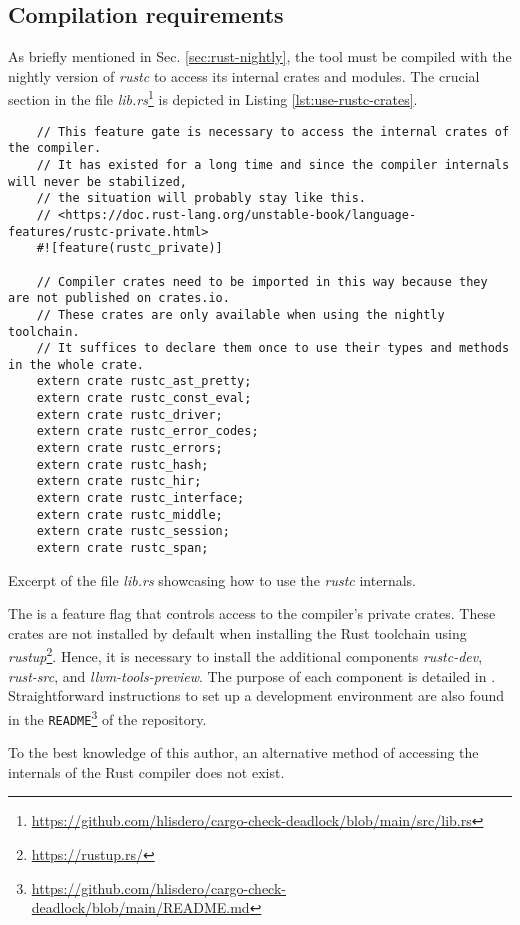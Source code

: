 \subsection{Compilation requirements}

As briefly mentioned in Sec. \ref{sec:rust-nightly}, the tool must be compiled
with the nightly version of \emph{rustc} to access its internal crates and modules.
The crucial section in the file
\emph{lib.rs}\footnote{\url{https://github.com/hlisdero/cargo-check-deadlock/blob/main/src/lib.rs}} is
depicted in Listing \ref{lst:use-rustc-crates}.

\begin{listing}
  \begin{verbatim}
    // This feature gate is necessary to access the internal crates of the compiler.
    // It has existed for a long time and since the compiler internals will never be stabilized,
    // the situation will probably stay like this.
    // <https://doc.rust-lang.org/unstable-book/language-features/rustc-private.html>
    #![feature(rustc_private)]
    
    // Compiler crates need to be imported in this way because they are not published on crates.io.
    // These crates are only available when using the nightly toolchain.
    // It suffices to declare them once to use their types and methods in the whole crate.
    extern crate rustc_ast_pretty;
    extern crate rustc_const_eval;
    extern crate rustc_driver;
    extern crate rustc_error_codes;
    extern crate rustc_errors;
    extern crate rustc_hash;
    extern crate rustc_hir;
    extern crate rustc_interface;
    extern crate rustc_middle;
    extern crate rustc_session;
    extern crate rustc_span;
  \end{verbatim}
  \caption{Excerpt of the file \emph{lib.rs} showcasing how to use the \emph{rustc} internals.}
  \label{lst:use-rustc-crates}
\end{listing}

The  is a feature flag
that controls access to the compiler's private crates.
These crates are not installed by default when installing the Rust toolchain
using \emph{rustup}\footnote{\url{https://rustup.rs/}}.
Hence, it is necessary to install the additional components \emph{rustc-dev},
\emph{rust-src}, and \emph{llvm-tools-preview}.
The purpose of each component is detailed in \cite{rustup-book}.
Straightforward instructions to set up a development environment are also found
in the \texttt{README}\footnote{\url{https://github.com/hlisdero/cargo-check-deadlock/blob/main/README.md}}
of the repository.

To the best knowledge of this author,
an alternative method of accessing the internals of the Rust compiler does not exist.
